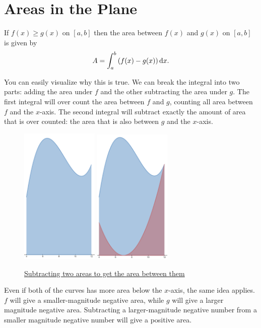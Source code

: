 \section{Areas in the Plane}
\begin{lemma}
	If $f(x) \geq g(x)$ on $[a,b]$ then the area between $f(x)$ and $g(x)$ on $[a,b]$ is given by
	\begin{equation*}
		A = \int_{a}^{b}{\left(f(x)-g(x)\right)\mathrm{d} x}.
	\end{equation*}
\end{lemma}
\noindent
You can easily visualize why this is true.
We can break the integral into two parts: adding the area under $f$ and the other subtracting the area under $g$.
The first integral will over count the area between $f$ and $g$, counting all area between $f$ and the $x$-axis.
The second integral will subtract exactly the amount of area that is over counted: the area that is also between $g$ and the $x$-axis.

\begin{figure}[H]
	\label{area_between_curves}
	\centering
	\includegraphics[width = 0.33\textwidth]{./applications_integrals/curve1.png}
	\includegraphics[width = 0.33\textwidth]{./applications_integrals/curve2.png}
	\caption{\hyperref{}{}{}{Subtracting two areas to get the area between them}}
\end{figure}
\noindent
Even if both of the curves has more area below the $x$-axis, the same idea applies.
$f$ will give a smaller-magnitude negative area, while $g$ will give a larger magnitude negative area.
Subtracting a larger-magnitude negative number from a smaller magnitude negative number will give a positive area.

